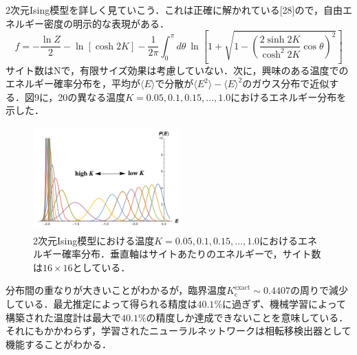\documentclass[a4paper,11pt]{jsarticle}
\begin{document}
2次元Ising模型を詳しく見ていこう．これは正確に解かれている[28]ので，自由エネルギー密度の明示的な表現がある．
\begin{equation}
  f = -\frac{\ln{Z}}{2} - \ln{[\cosh{2K}]} - \frac{1}{2\pi}\int_{0}^{\pi}d\theta \ \ln{\left[1 + \sqrt{1- \left(\frac{2\sinh{2K}}{\cosh^2{2K}}\cos{\theta}\right)^2}\right]}
\end{equation}
サイト数はNで，有限サイズ効果は考慮していない．次に，興味のある温度でのエネルギー確率分布を，平均が$\langle E \rangle$で分散が$\langle E^2 \rangle - \langle E \rangle^2$のガウス分布で近似する．図9に，20の異なる温度$K = 0.05, 0.1, 0.15, \dots, 1.0$におけるエネルギー分布を示した．
\begin{figure}
  \begin{center}
    \includegraphics[height=4cm]{image/Figure9.png}
    \caption{2次元Ising模型における温度$K = 0.05, 0.1, 0.15, \dots, 1.0$におけるエネルギー確率分布．垂直軸はサイトあたりのエネルギーで，サイト数は$16\times 16$としている．}
  \end{center}
\end{figure}
分布間の重なりが大きいことがわかるが，臨界温度$K_{\text{c}}^{\text{exact}} \sim 0.4407 $の周りで減少している．最尤推定によって得られる精度は$40.1\%$に過ぎず、機械学習によって構築された温度計は最大で$40.1\%$の精度しか達成できないことを意味している．それにもかかわらず，学習されたニューラルネットワークは相転移検出器として機能することがわかる．
\end{document}
